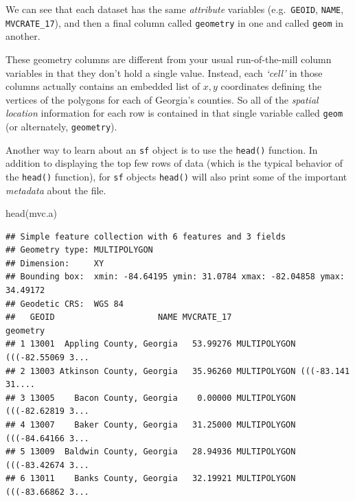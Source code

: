 \documentclass[
]{book}
\newenvironment{Shaded}{\begin{snugshade}}{\end{snugshade}}
\newcommand{\FunctionTok}[1]{\textcolor[rgb]{0.00,0.00,0.00}{#1}}
\newcommand{\NormalTok}[1]{#1}
\begin{document}
We can see that each dataset has the same \emph{attribute} variables (e.g.~\texttt{GEOID}, \texttt{NAME}, \texttt{MVCRATE\_17}), and then a final column called \texttt{geometry} in one and called \texttt{geom} in another.

These geometry columns are different from your usual run-of-the-mill column variables in that they don't hold a single value. Instead, each \emph{`cell'} in those columns actually contains an embedded list of \(x,y\) coordinates defining the vertices of the polygons for each of Georgia's counties. So all of the \emph{spatial location} information for each row is contained in that single variable called \texttt{geom} (or alternately, \texttt{geometry}).

Another way to learn about an \texttt{sf} object is to use the \texttt{head()} function. In addition to displaying the top few rows of data (which is the typical behavior of the \texttt{head()} function), for \texttt{sf} objects \texttt{head()} will also print some of the important \emph{metadata} about the file.

\begin{Shaded}
\begin{Highlighting}[]
\FunctionTok{head}\NormalTok{(mvc.a)}
\end{Highlighting}
\end{Shaded}

\begin{verbatim}
## Simple feature collection with 6 features and 3 fields
## Geometry type: MULTIPOLYGON
## Dimension:     XY
## Bounding box:  xmin: -84.64195 ymin: 31.0784 xmax: -82.04858 ymax: 34.49172
## Geodetic CRS:  WGS 84
##   GEOID                     NAME MVCRATE_17                       geometry
## 1 13001  Appling County, Georgia   53.99276 MULTIPOLYGON (((-82.55069 3...
## 2 13003 Atkinson County, Georgia   35.96260 MULTIPOLYGON (((-83.141 31....
## 3 13005    Bacon County, Georgia    0.00000 MULTIPOLYGON (((-82.62819 3...
## 4 13007    Baker County, Georgia   31.25000 MULTIPOLYGON (((-84.64166 3...
## 5 13009  Baldwin County, Georgia   28.94936 MULTIPOLYGON (((-83.42674 3...
## 6 13011    Banks County, Georgia   32.19921 MULTIPOLYGON (((-83.66862 3...
\end{verbatim}
\end{document}
